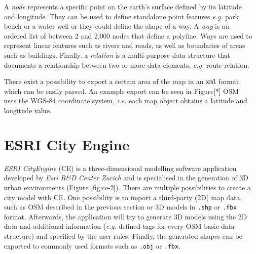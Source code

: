 A \emph{node} represents a specific point on the earth's surface defined by its latitude and longitude. They can be used to define standalone point features \emph{e.g.} park bench or a water well or they could define the shape of a way. A \emph{way} is an ordered list of between 2 and 2,000 nodes that define a polyline. Ways are used to represent linear features such as rivers and roads, as well as boundaries of areas such as buildings. Finally, a \emph{relation} is a multi-purpose data structure that documents a relationship between two or more data elements, \emph{e.g.} route relation.

There exist a possibility to export a certain area of the map in an \texttt{xml} format which can be easily parsed. An example export can be seen in Figure[*] OSM uses the WGS-84 coordinate system, \emph{i.e.} each map object obtains a latitude and longitude value. 

\section{ESRI City Engine}
\label{ch:ce}
\emph{ESRI CityEngine} (CE) is a three-dimensional modelling software application developed by \emph{Esri R\&D Center Zurich} and is specialised in the generation of 3D urban environments (Figure \ref{fig:ce-2}). There are multiple possibilities to create a city model with CE. One possibility is to import a third-party (2D) map data, such as OSM described in the previous section or 3D models in \texttt{.shp} or \texttt{.fbx} format. Afterwards, the application will try to generate 3D models using the 2D data and additional information (\emph{e.g.} defined tags for every OSM basic data structure) and specified by the user rules. Finally, the generated shapes can be exported to commonly used formats such as \texttt{.obj} or \texttt{.fbx}.

